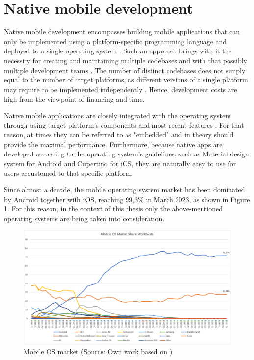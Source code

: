 
\section{Native mobile development}\label{chap:native}

Native mobile development encompasses building mobile applications that can only be implemented using a platform-specific programming language and deployed to a single operating system \cite{comparative_analysis_native_hybrid}. Such an approach brings with it the necessity for creating and maintaining multiple codebases and with that possibly multiple development teams \cite{approach_to_assess_performance_case_study}. The number of distinct codebases does not simply equal to the number of target platforms, as different versions of a single platform may require to be implemented independently \cite{appdynamics_mobile_app_performance}. Hence, development costs are high from the viewpoint of financing and time.

Native mobile applications are closely integrated with the operating system through using target platform's components \cite{comparison_perf_looks_flutter_native,comp_analysis_hybrid_frameworks} and most recent features \cite{eval_rn_flutter}. For that reason, at times they can be referred to as "embedded" 
 \cite{cross_platform_development_study_rn_flutter} and in theory should provide the maximal performance. Furthermore, because native apps are developed according to the operating system's guidelines, such as Material design system for Android and Cupertino for iOS, they are naturally easy to use for users accustomed to that specific platform.

Since almost a decade, the mobile operating system market has been dominated by Android together with iOS, reaching 99,3\% in March 2023, as shown in Figure \ref{fig:mobile_os_market}. For this reason, in the context of this thesis only the above-mentioned operating systems are being taken into consideration.

\begin{figure}[h]
  \centering
  \includegraphics[width=\textwidth]{img/mobile_os_market}
  \caption{Mobile OS market (Source: Own work based on \cite{statcounter_mobile_os_market})}
  \label{fig:mobile_os_market}
\end{figure}

